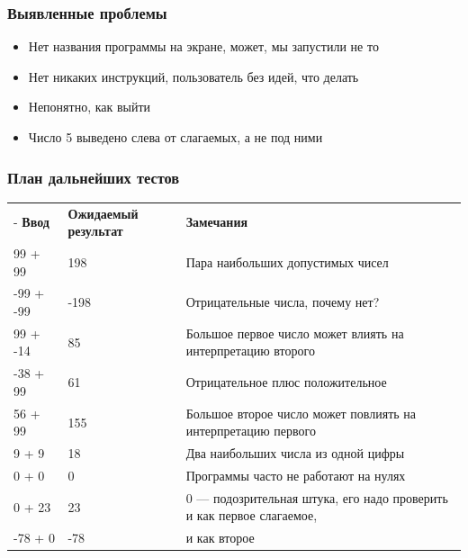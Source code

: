 \documentclass[xetex,mathserif,serif]{beamer}
\begin{document}
	\begin{frame}
		\frametitle{Выявленные проблемы}
		\begin{itemize}
			\item Нет названия программы на экране, может, мы запустили не то
			\item Нет никаких инструкций, пользователь без идей, что делать
			\item Непонятно, как выйти
			\item Число 5 выведено слева от слагаемых, а не под ними
		\end{itemize}
	\end{frame}

	\begin{frame}
		\frametitle{План дальнейших тестов}
		\begin{scriptsize}
			\begin{center}
				\begin{tabu} {| X[2 l p] | X[2 l p] | X[7 l p] |}
					\tabucline-
					\everyrow{\tabucline-}
					\textbf{Ввод}  & \textbf{Ожидаемый результат}  & \textbf{Замечания}                                                      \\
					99 + 99        & 198                           & Пара наибольших допустимых чисел                                        \\
					-99 + -99      & -198                          & Отрицательные числа, почему нет?                                        \\
					99 + -14       & 85                            & Большое первое число может влиять на интерпретацию второго              \\
					-38 + 99       & 61                            & Отрицательное плюс положительное                                        \\
					56 + 99        & 155                           & Большое второе число может повлиять на интерпретацию первого            \\
					9 + 9          & 18                            & Два наибольших числа из одной цифры                                     \\
					0 + 0          & 0                             & Программы часто не работают на нулях                                    \\
					0 + 23         & 23                            & 0 --- подозрительная штука, его надо проверить и как первое слагаемое,  \\
					-78 + 0        & -78                           & и как второе
				\end{tabu}
			\end{center}
		\end{scriptsize}
	\end{frame}
\end{document}
